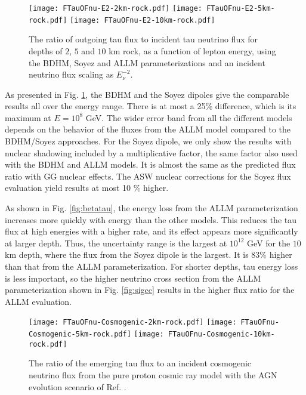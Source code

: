 \documentclass[aps,10pt,twocolumn,tightenlines]{revtex4-1}
\begin{document}
\begin{figure}[htb]
\centering
	\texttt{[image: FTauOFnu-E2-2km-rock.pdf]}
	\texttt{[image: FTauOFnu-E2-5km-rock.pdf]}
	\texttt{[image: FTauOFnu-E2-10km-rock.pdf]}	
	\caption{The ratio of outgoing tau flux to incident tau neutrino flux for 
depths of $2$, $5$ and $10$  km rock, as a function of lepton energy, using the BDHM, Soyez and ALLM parameterizations and an incident neutrino flux scaling as $E_\nu^{-2}$.}
\label{fig:flux-diffuse-le}
\end{figure}

As presented in Fig. \ref{fig:flux-diffuse-le}, the BDHM and the Soyez dipoles give the comparable results all over the energy range. There is at most a  25\% difference, which is its maximum at $E=10^8$ GeV.
The wider error band from all the different models depends on the behavior of the fluxes from the ALLM model compared to the BDHM/Soyez approaches. 
For the Soyez dipole, we only show the results with nuclear shadowing included by a multiplicative factor, the same factor also used with the BDHM and ALLM models. 
It is almost the same as the predicted flux ratio with GG nuclear effects.
The ASW nuclear corrections for the Soyez flux evaluation yield results at most 10 \% higher.

As shown in Fig. \ref{fig:betatau}, the energy loss from the ALLM parameterization increases more quickly with energy than the other models.
This reduces the tau flux at high energies with a higher rate, and its effect appears more significantly at larger depth.  
Thus, the uncertainty range is the largest at $10^{12}$ GeV for the $10$  km depth, 
where the flux from the Soyez dipole is the largest. It is $83 \%$ 
 higher than that from the ALLM parameterization. 
For shorter depths, tau energy loss is less important, so the higher neutrino cross 
section from the ALLM parameterization shown in Fig. \ref{fig:sigcc} results 
in the higher flux ratio for the ALLM evaluation.

\begin{figure}[htb]
\centering
	\texttt{[image: FTauOFnu-Cosmogenic-2km-rock.pdf]}
	\texttt{[image: FTauOFnu-Cosmogenic-5km-rock.pdf]}
	\texttt{[image: FTauOFnu-Cosmogenic-10km-rock.pdf]}
	\caption{The ratio of the emerging tau flux to an incident  cosmogenic neutrino flux from
	the pure proton cosmic ray model with the AGN evolution scenario of Ref. \cite{Aloisio:2015ega}. }
\label{fig:flux-cosmogenic}
\end{figure}
\end{document}
